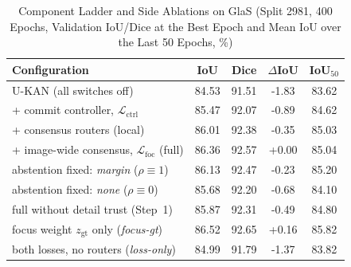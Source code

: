 \begin{table}[!t]
\caption{Component Ladder and Side Ablations on GlaS (Split 2981, 400 Epochs, Validation IoU/Dice at the Best Epoch and Mean IoU over the Last 50 Epochs, \%)}
\label{tab:ablation}
\centering\footnotesize
\setlength{\tabcolsep}{3.0pt}
\begin{tabular}{@{}lcccc@{}}
\toprule
Configuration & IoU & Dice & $\Delta$IoU & IoU$_{50}$ \\
\midrule
U-KAN (all switches off) & 84.53 & 91.51 & -1.83 & 83.62 \\
+ commit controller, $\mathcal{L}_{\mathrm{ctrl}}$ & 85.47 & 92.07 & -0.89 & 84.62 \\
+ consensus routers (local) & 86.01 & 92.38 & -0.35 & 85.03 \\
+ image-wide consensus, $\mathcal{L}_{\mathrm{foc}}$ (full) & 86.36 & 92.57 & +0.00 & 85.04 \\
\midrule
abstention fixed: \emph{margin} ($\rho\equiv1$) & 86.13 & 92.47 & -0.23 & 85.20 \\
abstention fixed: \emph{none} ($\rho\equiv0$) & 85.68 & 92.20 & -0.68 & 84.10 \\
full without detail trust (Step~1) & 85.87 & 92.31 & -0.49 & 84.80 \\
focus weight $z_{\mathrm{gt}}$ only (\emph{focus-gt}) & 86.52 & 92.65 & +0.16 & 85.82 \\
both losses, no routers (\emph{loss-only}) & 84.99 & 91.79 & -1.37 & 83.82 \\
\bottomrule
\end{tabular}
\end{table}
